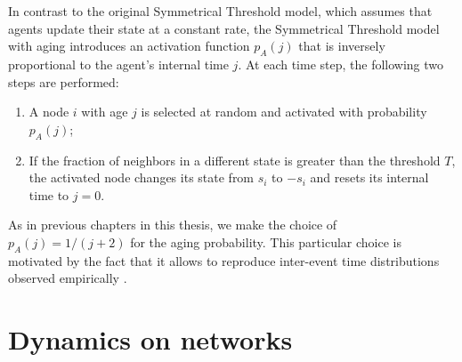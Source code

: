 In contrast to the original Symmetrical Threshold model, which assumes that agents update their state at a constant rate, the Symmetrical Threshold model with aging introduces an activation function $p_A (j)$ that is inversely proportional to the agent's internal time $j$. At each time step, the following two steps are performed:

\begin{enumerate}
    \item A node $i$ with age $j$ is selected at random and activated with probability $p_A(j)$;
    \item If the fraction of neighbors in a different state is greater than the threshold $T$, the activated node changes its state from $s_i$ to $-s_i$ and resets its internal time to $j=0$.
\end{enumerate}

As in previous chapters in this thesis, we make the choice of $p_A(j) = 1/(j+2)$ for the aging probability. This particular choice is motivated by the fact that it allows to reproduce inter-event time distributions observed empirically \cite{rybski-2009,artime-2017}. 

\section{\label{sec:Dynamics on networks} Dynamics on networks}

